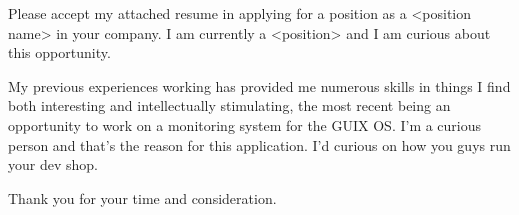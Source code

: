 \documentclass[10pt,stdletter,dateno,sigleft]{newlfm} %
\begin{document}
\begin{newlfm}



  Please accept my attached resume in applying for a position as a <position
  name> in your company. I am currently a <position> and I am curious about this
  opportunity.


  My previous experiences working has provided me numerous skills in things I
  find both interesting and intellectually stimulating, the most recent being an
  opportunity to work on a monitoring system for the GUIX OS. I'm a curious
  person and that's the reason for this application. I'd curious on how you guys
  run your dev shop.


  Thank you for your time and consideration.



\end{newlfm}
\end{document}
